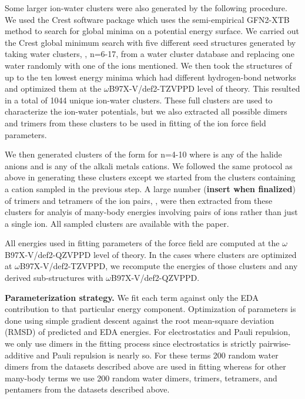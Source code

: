 \documentclass[journal=jctcce,manuscript=article]{achemso}
\begin{document}
Some larger ion-water clusters were also generated by the following procedure. We used the Crest software package\cite{pracht2020automated} which uses the semi-empirical GFN2-XTB\cite{bannwarth2019gfn2} method to search for global minima on a potential energy surface. We carried out the Crest global minimum search with five different seed structures generated by taking water clusters, , n=6-17, from a water cluster database\cite{rakshit2019atlas} and replacing one water randomly with one of the ions mentioned. We then took the structures of up to the ten lowest energy minima which had different hydrogen-bond networks and optimized them at the $\omega$B97X-V/def2-TZVPPD level of theory. This resulted in a total of 1044 unique ion-water clusters. These full clusters are used to characterize the ion-water potentials, but we also extracted all possible dimers and trimers from these clusters to be used in fitting of the ion force field parameters.

We then generated clusters of the form  for n=4-10 where  is any of the halide anions and  is any of the alkali metals cations. We followed the same protocol as above in generating these clusters except we started from the clusters containing a cation sampled in the previous step. A large number (\textbf{insert when finalized}) of trimers and tetramers of the ion pairs, , were then extracted from these clusters for analyis of many-body energies involving pairs of ions rather than just a single ion. All sampled clusters are available with the paper.

All energies used in fitting parameters of the force field are computed at the $\omega$B97X-V/def2-QZVPPD level of theory. In the cases where clusters are optimized at $\omega$B97X-V/def2-TZVPPD, we recompute the energies of those clusters and any derived sub-structures with $\omega$B97X-V/def2-QZVPPD.

\textbf{Parameterization strategy.} We fit each term against only the EDA contribution to that particular energy component. Optimization of parameters is done using simple gradient descent against the root mean-square deviation (RMSD) of predicted and EDA energies. For electrostatics and Pauli repulsion, we only use dimers in the fitting process since electrostatics is strictly pairwise-additive and Pauli repulsion is nearly so. For these terms 200 random water dimers from the datasets described above are used in fitting whereas for other many-body terms we use 200 random water dimers, trimers, tetramers, and pentamers from the datasets described above.
\end{document}
